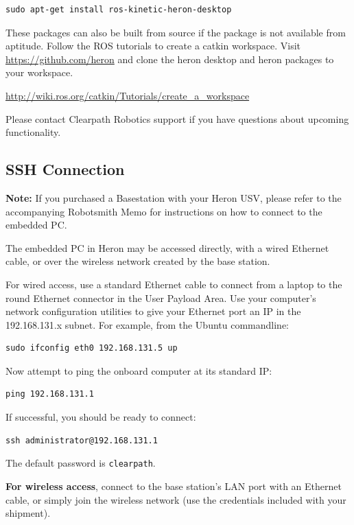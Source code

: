 \documentclass[]{clearpath-latex/clearpath-manual}
\begin{document}
\begin{lstlisting}
sudo apt-get install ros-kinetic-heron-desktop
\end{lstlisting}

These packages can also be built from source if the package is not available from aptitude. Follow the ROS tutorials to create a catkin workspace. Visit \url{https://github.com/heron} and clone the heron desktop and heron packages to your workspace.

\url{http://wiki.ros.org/catkin/Tutorials/create_a_workspace}

Please contact Clearpath Robotics support if you have questions about upcoming functionality.



\subsection{SSH Connection}

\textbf{Note:} If you purchased a Basestation with your Heron USV, please refer to the accompanying Robotsmith Memo for instructions on how to connect to the embedded PC.

The embedded PC in Heron may be accessed directly, with a wired Ethernet cable, or over the wireless network created by the base station.

For wired access, use a standard Ethernet cable to connect from a laptop to the round Ethernet connector in the User Payload Area. Use your computer’s network configuration utilities to give your Ethernet port an IP in the 192.168.131.x subnet. For example, from the Ubuntu commandline:

\begin{lstlisting}
sudo ifconfig eth0 192.168.131.5 up
\end{lstlisting}

Now attempt to ping the onboard computer at its standard IP:

\begin{lstlisting}
ping 192.168.131.1
\end{lstlisting}

If successful, you should be ready to connect:

\begin{lstlisting}
ssh administrator@192.168.131.1
\end{lstlisting}

The default password is \lstinline{clearpath}.


\textbf{For wireless access}, connect to the base station’s LAN port with an Ethernet cable, or simply join the wireless network (use the credentials included with your shipment).
\end{document}
